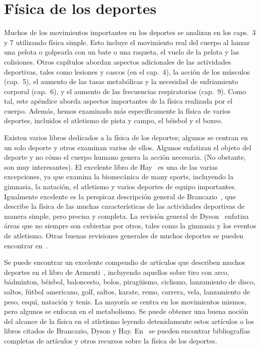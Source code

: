 \documentclass[12pt,a4paper]{book}
\begin{document}
\chapter{Física de los deportes}
\label{app:g}

Muchos de los movimientos importantes en los deportes se analizan en los caps.~3 y 7 utilizando física simple. Esto incluye el movimiento real del cuerpo al lanzar una pelota o golpearla con un bate o una raqueta, el vuelo de la pelota y las colisiones. Otros capítulos abordan aspectos adicionales de las actividades deportivas, tales como lesiones y cascos (en el cap.~4), la acción de los músculos (cap.~5), el aumento de las tasas metabólicas y la necesidad de enfriamiento corporal (cap.~6), y el aumento de las frecuencias respiratorias (cap.~9). Como tal, este apéndice aborda aspectos importantes de la física realizada por el cuerpo. Además, hemos examinado más específicamente la física de varios deportes, incluidos el atletismo de pista y campo, el béisbol y el boxeo.

Existen varios libros dedicados a la física de los deportes; algunos se centran en un solo deporte y otros examinan varios de ellos. Algunos enfatizan el objeto del deporte y no cómo el cuerpo humano genera la acción necesaria. (No obstante, son muy interesantes). El excelente libro de Hay~\cite{g17} es una de las varias excepciones, ya que examina la biomecánica de many sports, incluyendo la gimnasia, la natación, el atletismo y varios deportes de equipo importantes. Igualmente excelente es la perspicaz descripción general de Brancazio~\cite{g4}, que describe la física de las muchas características de las actividades deportivas de manera simple, pero precisa y completa. La revisión general de Dyson~\cite{g10} enfatiza áreas que no siempre son cubiertas por otros, tales como la gimnasia y los eventos de atletismo. Otras buenas revisiones generales de muchos deportes se pueden encontrar en~\cite{g27}.

Se puede encontrar un excelente compendio de artículos que describen muchos deportes en el libro de Armenti~\cite{g3}, incluyendo aquellos sobre tiro con arco, bádminton, béisbol, baloncesto, bolos, piragüismo, ciclismo, lanzamiento de disco, saltos, fútbol americano, golf, saltos, karate, remo, carrera, vela, lanzamiento de peso, esquí, natación y tenis. La mayoría se centra en los movimientos mismos, pero algunos se enfocan en el metabolismo. Se puede obtener una buena noción del alcance de la física en el atletismo leyendo detenidamente estos artículos o los libros citados de Brancazio, Dyson y Hay. En~\cite{g13, g14} se pueden encontrar bibliografías completas de artículos y otros recursos sobre la física de los deportes.
\end{document}
